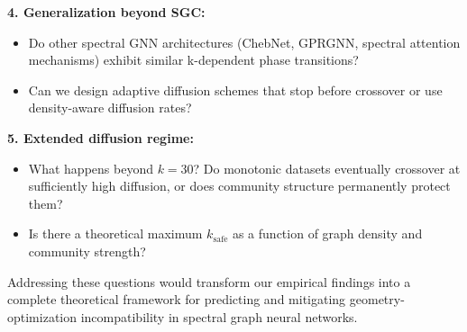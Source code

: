 \documentclass[11pt]{article}
\begin{document}
\textbf{4. Generalization beyond SGC:}
\begin{itemize}
\item Do other spectral GNN architectures (ChebNet, GPRGNN, spectral attention mechanisms) exhibit similar k-dependent phase transitions?
\item Can we design adaptive diffusion schemes that stop before crossover or use density-aware diffusion rates?
\end{itemize}

\textbf{5. Extended diffusion regime:}
\begin{itemize}
\item What happens beyond $k{=}30$? Do monotonic datasets eventually crossover at sufficiently high diffusion, or does community structure permanently protect them?
\item Is there a theoretical maximum $k_{\text{safe}}$ as a function of graph density and community strength?
\end{itemize}

Addressing these questions would transform our empirical findings into a complete theoretical framework for predicting and mitigating geometry-optimization incompatibility in spectral graph neural networks.
\end{document}

